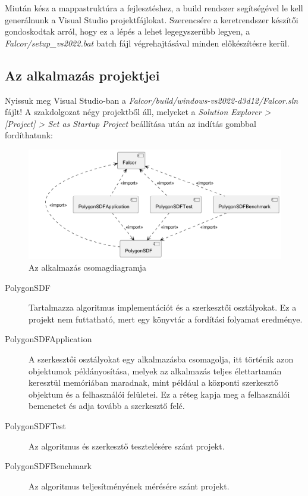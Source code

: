 Miután kész a mappastruktúra a fejlesztéshez, a build rendszer segítségével le kell generálnunk a Visual Studio projektfájlokat. Szerencsére a keretrendszer készítői gondoskodtak arról, hogy ez a lépés a lehet legegyszerűbb legyen, a \textit{Falcor/setup\_vs2022.bat} batch fájl végrehajtásával minden előkészítésre kerül.


\subsection{Az alkalmazás projektjei}

Nyissuk meg Visual Studio-ban a \textit{Falcor/build/windows-vs2022-d3d12/Falcor.sln} fájlt! A szakdolgozat négy projektből áll, melyeket a \textit{Solution Explorer > [Project] > Set as Startup Project} beállítása után az indítás gombbal fordíthatunk:

\begin{figure}[H]
	\centering
	\includegraphics[width=1\linewidth]{images/component_project.png}
	\caption{Az alkalmazás csomagdiagramja}
	\label{fig:component_project-1}
\end{figure}

\begin{description}
	\item[PolygonSDF] Tartalmazza algoritmus implementációt és a szerkesztői osztályokat. Ez a projekt nem futtatható, mert egy könyvtár a fordítási folyamat eredménye.
	\item[PolygonSDFApplication] A szerkesztői osztályokat egy alkalmazásba csomagolja, itt történik azon objektumok példányosítása, melyek az alkalmazás teljes élettartamán keresztül memóriában maradnak, mint például a központi szerkesztő objektum és a felhasználói felületei. Ez a réteg  kapja meg a felhasználói bemenetet és adja tovább a szerkesztő felé.
	\item[PolygonSDFTest] Az algoritmus és szerkesztő tesztelésére szánt projekt.
	\item[PolygonSDFBenchmark] Az algoritmus teljesítményének mérésére szánt projekt.
\end{description}


